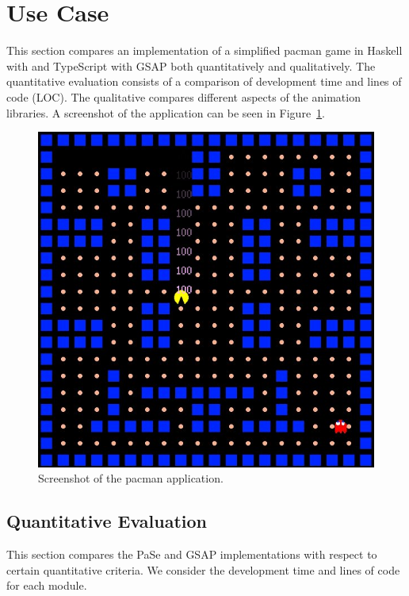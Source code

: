 \section{Use Case}

This section compares an implementation of a simplified pacman game in Haskell with \dsl{} and TypeScript with GSAP both quantitatively and qualitatively. The quantitative evaluation consists of a comparison of development time and lines of code (LOC). The qualitative compares different aspects of the animation libraries. A screenshot of the application can be seen in Figure~\ref{fig:pacman}.

\begin{figure}[h]{\textwidth}
\centering
\includegraphics[width=\figscale\textwidth]{pictures/pacman}
\caption{Screenshot of the pacman application.}
\label{fig:pacman}
\end{figure}

\subsection{Quantitative Evaluation}

This section compares the PaSe and GSAP implementations with respect to certain quantitative criteria. We consider the development time and lines of code for each module.

